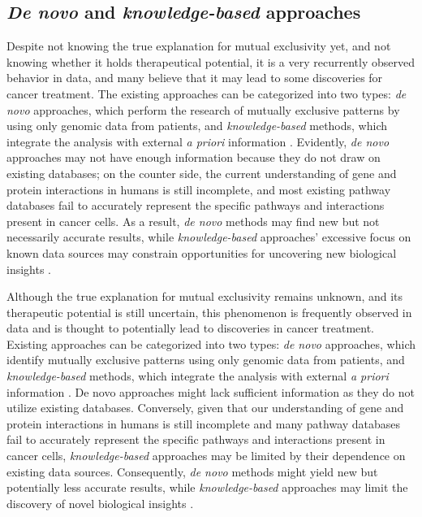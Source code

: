 \subsection{\textit{De novo} and \textit{knowledge-based} approaches}

Despite not knowing the true explanation for mutual exclusivity yet, and not knowing whether it holds therapeutical potential, it is a very recurrently observed behavior in data, and many believe that it may lead to some discoveries for cancer treatment. The existing approaches can be categorized into two types: \textit{de novo} approaches, which perform the research of mutually exclusive patterns by using only genomic data from patients, and \textit{knowledge-based} methods, which integrate the analysis with external \textit{a priori} information \cite{survey}. Evidently, \textit{de novo} approaches may not have enough information because they do not draw on existing databases; on the counter side, the current understanding of gene and protein interactions in humans is still incomplete, and most existing pathway databases fail to accurately represent the specific pathways and interactions present in cancer cells. As a result, \textit{de novo} methods may find new but not necessarily accurate results, while \textit{knowledge-based} approaches' excessive focus on known data sources may constrain opportunities for uncovering new biological insights \cite{multi-dendrix}.

Although the true explanation for mutual exclusivity remains unknown, and its therapeutic potential is still uncertain, this phenomenon is frequently observed in data and is thought to potentially lead to discoveries in cancer treatment. Existing approaches can be categorized into two types: \textit{de novo} approaches, which identify mutually exclusive patterns using only genomic data from patients, and \textit{knowledge-based} methods, which integrate the analysis with external \textit{a priori} information \cite{survey}. De novo approaches might lack sufficient information as they do not utilize existing databases. Conversely, given that our understanding of gene and protein interactions in humans is still incomplete and many pathway databases fail to accurately represent the specific pathways and interactions present in cancer cells, \textit{knowledge-based} approaches may be limited by their dependence on existing data sources. Consequently, \textit{de novo} methods might yield new but potentially less accurate results, while \textit{knowledge-based} approaches may limit the discovery of novel biological insights \cite{multi-dendrix}.

\cleardoublepage
